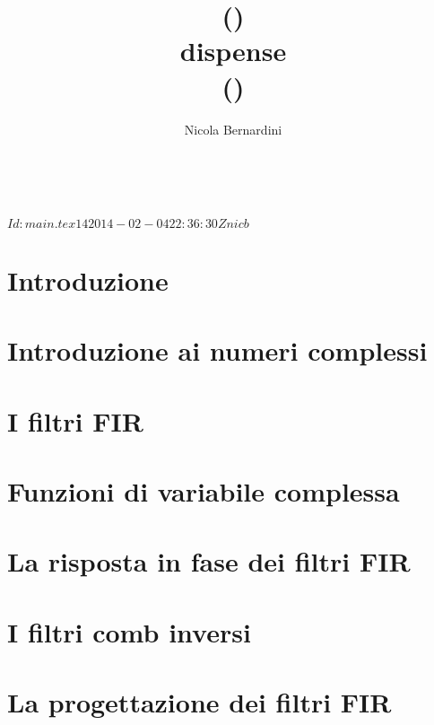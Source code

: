\documentclass{scrbook}
\title{%
	\topic (\topicacro) \level\\dispense\\{\tiny (\rcstag)}%
}
\author{Nicola Bernardini\\[2cm]\license}
\date{~}
\begin{document}
\svnInfo $Id: main.tex 14 2014-02-04 22:36:30Z nicb $

\maketitle

\tableofcontents

\chapter{Introduzione\label{chap:introduction}}



\chapter{Introduzione ai numeri complessi\label{chap:complex numbers}}



\chapter{I filtri FIR\label{chap:fir}}



\chapter{Funzioni di variabile complessa\label{chap:complex variable functions}}



\chapter{La risposta in fase dei filtri FIR\label{chap:FIR phase response}}



\chapter{I filtri comb inversi\label{chap:icf}}


\chapter{La progettazione dei filtri FIR\label{chap:filter design}}



% 



\end{document}

